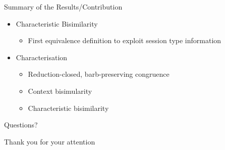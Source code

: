 \documentclass{beamer}
\begin{document}
	\begin{frame}{Summary of the Results/Contribution}
		\begin{itemize}
			\item	Characteristic Bisimilarity
				\begin{itemize}
					\item	First equivalence definition to exploit session type information
				\end{itemize}

			\item	Characterisation
				\begin{itemize}
					\item	Reduction-closed, barb-preserving congruence
					\item	Context bisimularity
					\item	Characteristic bisimilarity
				\end{itemize}

		\end{itemize}
	\end{frame}

	\begin{frame}{Questions?}
		\begin{center}
			\huge Thank you for your attention
		\end{center}
	\end{frame}
\end{document}
